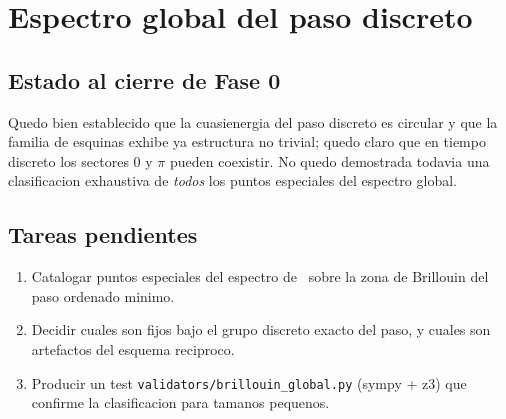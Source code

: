 \chapter{Espectro global del paso discreto}
\label{ch:brillouin-global}

\section{Estado al cierre de Fase 0}

Quedo bien establecido que la cuasienergia del paso discreto es circular y
que la familia de esquinas exhibe ya estructura no trivial; quedo claro que
en tiempo discreto los sectores $0$ y $\pi$ pueden coexistir. No quedo
demostrada todavia una clasificacion exhaustiva de \emph{todos} los puntos
especiales del espectro global.

\section{Tareas pendientes}

\begin{enumerate}[label=(B\arabic*),leftmargin=*]
  \item Catalogar puntos especiales del espectro de \Uop\ sobre la zona de
        Brillouin del paso ordenado minimo.
  \item Decidir cuales son fijos bajo el grupo discreto exacto del paso, y
        cuales son artefactos del esquema reciproco.
  \item Producir un test \texttt{validators/brillouin\_global.py} (sympy +
        z3) que confirme la clasificacion para tamanos pequenos.
\end{enumerate}
